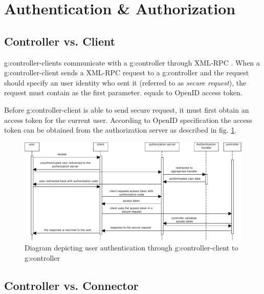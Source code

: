 

\section{Authentication \& Authorization}
\label{sec:implementation-authorization}

\subsection{Controller vs. Client}
\Glspl{g:controller-client} communicate with a \gls{g:controller} through XML-RPC \cite{xml-rpc}. When a \gls{g:controller-client} sends a XML-RPC request to a \gls{g:controller} and the request should specify an user identity who sent it (referred to as \emph{secure request}), the request must contain  as the first parameter.  equals to OpenID \cite{openid} access token.

Before \gls{g:controller-client} is able to send secure request, it must first obtain an access token for the current user. According to OpenID specification the access token can be obtained from the authorization server as described in fig. \ref{fig:sd_controller_client_authentication}.

\begin{figure}[ht!]
\includegraphics[width=\textwidth]{diagrams/sd_controller_client_authentication}
\caption{Diagram depicting user authentication through \gls{g:controller-client} to \gls{g:controller}}
\label{fig:sd_controller_client_authentication}
\end{figure}


\subsection{Controller vs. Connector}

